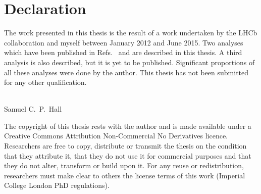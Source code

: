 \clearpage
\chapter*{\centering Declaration}

\begin{center}
  {\setlength{\currentparskip}{\parskip}%
  \begin{minipage}{\abstractpagewidth}
    \setlength{\parskip}{\currentparskip}%
    The work presented in this thesis is the result of a work undertaken by the
    LHCb collaboration and myself between January 2012 and June 2015.
    Two analyses which have been
    published in Refs.~\cite{LHCb-PAPER-2012-025,LHCb-PAPER-2014-030} and are described in this thesis.
    A third analysis is also described, but it is yet to be published.
    Significant proportions of all these analyses were done by the author.
    This thesis has not been submitted for any other qualification.
    \\\\
    \begin{flushright}
      Samuel C.~P.~Hall\\
      \shortdate
    \end{flushright}
  \end{minipage}

    \vfill

  \begin{minipage}{0.8\textwidth}
    \footnotesize
    The copyright of this thesis rests with the author and is made available under a Creative
    Commons Attribution Non-Commercial No Derivatives licence. Researchers are free to copy,
    distribute or transmit the thesis on the condition that they attribute it, that they do not use
    it for commercial purposes and that they do not alter, transform or build upon it. For any
    reuse or redistribution, researchers must make clear to others the license terms of this work
    (Imperial College London PhD regulations).
  \end{minipage}}
  \vspace{1.0cm}
\end{center}
